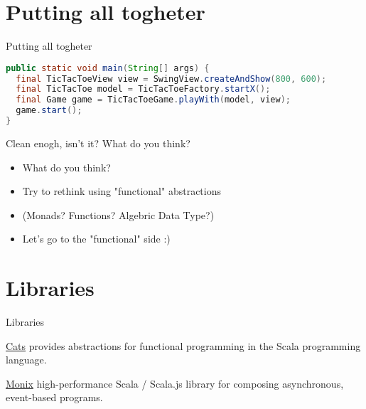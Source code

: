 \documentclass[presentation]{beamer}
\let\oldcite\cite
\renewcommand{\cite}[1]{{\color{blue}\oldcite{#1}}}
\begin{document}
\section{Putting all togheter}
\begin{frame}[fragile]{Putting all togheter}

\begin{lstlisting}[language=Java]
public static void main(String[] args) {
  final TicTacToeView view = SwingView.createAndShow(800, 600);
  final TicTacToe model = TicTacToeFactory.startX();
  final Game game = TicTacToeGame.playWith(model, view);
  game.start();
}
\end{lstlisting}
\begin{block}{Clean enogh, isn't it?}
  What do you think?
  \begin{itemize}
    \item What do you think?
    \item Try to rethink using "functional" abstractions
    \item (Monads? Functions? Algebric Data Type?)
    \item Let's go to the "functional" side :)
  \end{itemize}
\end{block}
\end{frame}

\section{Libraries}
\begin{frame}[fragile]{Libraries}

\begin{block}{\href{https://typelevel.org/cats/}{Cats} \cite{scalacats2017}}
  provides abstractions for functional programming in the Scala programming language.
\end{block}

\begin{block}{\href{https://monix.io/}{Monix}}
  high-performance Scala / Scala.js library for composing asynchronous, event-based programs.
\end{block}

\end{frame}
\end{document}
